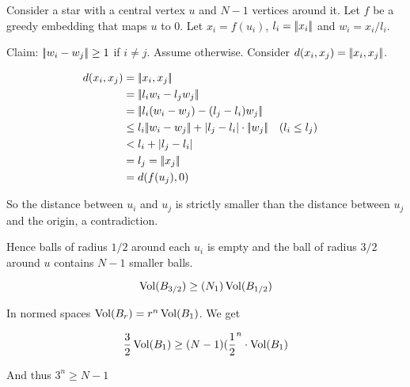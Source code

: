 \begin{pr} Consider a star with a central vertex $u$ and $N-1$ vertices around it. Let $f$ be a greedy embedding that maps $u$ to $0$. Let $x_i=f(u_i)$, $l_i=|\!|x_i|\!|$ and $w_i = x_i/l_i$.

Claim: $|\!|w_i-w_j|\!| \geq 1$ if $i\neq j$. Assume otherwise. Consider $d(x_i,x_j)=|\!|x_i,x_j|\!|$.

\begin{align*}
d(x_i,x_j)&=\norm{x_i,x_j} \\
	&=\norm{l_iw_i - l_jw_j}\\
	&=\norm{l_i(w_i-w_j) -(l_j-l_i)w_j}\\
  &\leq l_i \norm{w_i-w_j} + |l_j-l_i|\cdot \norm{w_j} && (l_i\leq l_j)\\
  &< l_i + |l_j-l_i|\\
  &=l_j = \norm{x_j}\\
  &=d(f(u_j),0)
\end{align*}

So the distance between $u_i$ and $u_j$ is strictly smaller than the distance between $u_j$ and the origin, a contradiction.

Hence balls of radius $1/2$ around each $u_i$ is empty and the ball of radius $3/2$ around $u$ contains $N-1$ smaller balls.

\[\operatorname{Vol}(B_{3/2}) \geq (N_1)\operatorname{Vol}(B_{1/2})\]

In normed spaces $\operatorname{Vol}(B_r) = r^n \operatorname{Vol}(B_1)$. We get

\[\frac 32 \operatorname{Vol}(B_1) \geq (N-1)(\frac 12^n \cdot \operatorname{Vol}(B_1)\]

And thus $3^n\geq N-1$
\end{pr}